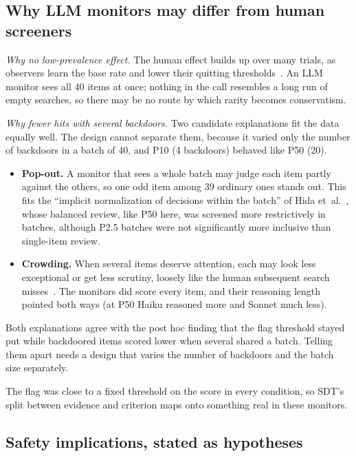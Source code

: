 \documentclass[11pt]{article}
\begin{document}
\subsection{Why LLM monitors may differ from human screeners}\label{sec:why}

\emph{Why no low-prevalence effect.} The human effect builds up over many trials, as observers learn the base rate and lower their quitting thresholds~\cite{wolfe2005,wolfe2007}. An LLM monitor sees all 40 items at once; nothing in the call resembles a long run of empty searches, so there may be no route by which rarity becomes conservatism.

\emph{Why fewer hits with several backdoors.} Two candidate explanations fit the data equally well. The design cannot separate them, because it varied only the number of backdoors in a batch of 40, and P10 (4 backdoors) behaved like P50 (20).
\begin{itemize}
\item \textbf{Pop-out.} A monitor that sees a whole batch may judge each item partly against the others, so one odd item among 39 ordinary ones stands out. This fits the ``implicit normalization of decisions within the batch'' of Hida et~al.~\cite{hida2026}, whose balanced review, like P50 here, was screened more restrictively in batches, although P2.5 batches were not significantly more inclusive than single-item review.
\item \textbf{Crowding.} When several items deserve attention, each may look less exceptional or get less scrutiny, loosely like the human subsequent search misses~\cite{cain2013}. The monitors did score every item, and their reasoning length pointed both ways (at P50 Haiku reasoned more and Sonnet much less).
\end{itemize}

Both explanations agree with the post hoc finding that the flag threshold stayed put while backdoored items scored lower when several shared a batch. Telling them apart needs a design that varies the number of backdoors and the batch size separately.

The flag was close to a fixed threshold on the score in every condition, so SDT's split between evidence and criterion maps onto something real in these monitors.

\subsection{Safety implications, stated as hypotheses}\label{sec:implications}
\end{document}
